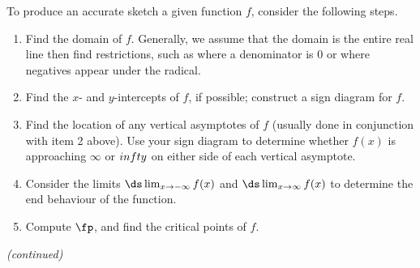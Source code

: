 \enlargethispage{2\baselineskip}
{}
{To produce an accurate sketch a given function $f$, consider the following steps.
\begin{enumerate}
\item		Find the domain of $f$. Generally, we assume that the domain is the entire real line then find restrictions, such as where a denominator is 0 or where negatives appear under the radical.
\item 		Find the $x$- and $y$-intercepts of $f$, if possible; construct a sign diagram for $f$.
\item		Find the location of any vertical asymptotes of $f$ (usually done in conjunction with item 2 above). Use your sign diagram to determine whether $f(x)$ is approaching $\infty$ or $\-infty$ on either side of each vertical asymptote.
\item		Consider the limits $\ds\lim_{x\to-\infty}f(x)$ and $\ds\lim_{x\to\infty}f(x)$ to determine the end behaviour of the function.
\item		Compute  $\fp$, and find the critical points of $f$.
\end{enumerate}
\small\textit{(continued)}\normalsize
}
\addtocounter{keyideacounter}{-1}
